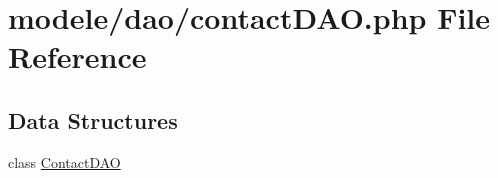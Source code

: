 \hypertarget{contact_d_a_o_8php}{}\section{modele/dao/contact\+D\+AO.php File Reference}
\label{contact_d_a_o_8php}
\subsection*{Data Structures}
\begin{DoxyCompactItemize}
\item 
class \hyperlink{class_contact_d_a_o}{Contact\+D\+AO}
\end{DoxyCompactItemize}
